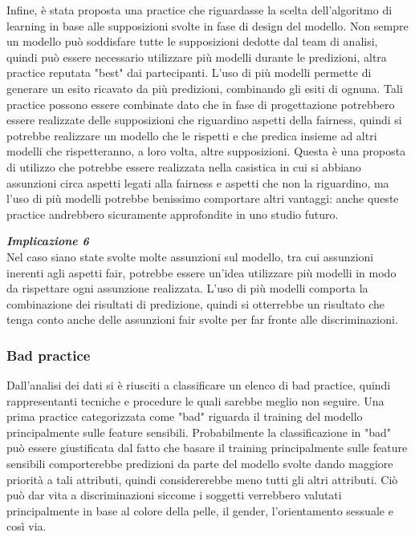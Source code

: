 Infine, è stata proposta una practice che riguardasse la scelta dell'algoritmo di learning in base alle supposizioni svolte in fase di design del modello. Non sempre un modello può soddisfare tutte le supposizioni dedotte dal team di analisi, quindi può essere necessario utilizzare più modelli durante le predizioni, altra practice reputata "best" dai partecipanti. L'uso di più modelli permette di generare un esito ricavato da più predizioni, combinando gli esiti di ognuna. Tali practice possono essere combinate dato che in fase di progettazione potrebbero essere realizzate delle supposizioni che riguardino aspetti della fairness, quindi si potrebbe realizzare un modello che le rispetti e che predica insieme ad altri modelli che rispetteranno, a loro volta, altre supposizioni. Questa è una proposta di utilizzo che potrebbe essere realizzata nella casistica in cui si abbiano assunzioni circa aspetti legati alla fairness e aspetti che non la riguardino, ma l'uso di più modelli potrebbe benissimo comportare altri vantaggi: anche queste practice andrebbero sicuramente approfondite in uno studio futuro.

\begin{center}
    \begin{tcolorbox}[width=400pt, colframe=black, colback=Gray!10]
			\begin{minipage}{\textwidth}
				\textit{\faCaretSquareORight  \textbf{ Implicazione 6}}\\
		     Nel caso siano state svolte molte assunzioni sul modello, tra cui assunzioni inerenti agli aspetti fair, potrebbe essere un'idea utilizzare più modelli in modo da rispettare ogni assunzione realizzata. L'uso di più modelli comporta la combinazione dei risultati di predizione, quindi si otterrebbe un risultato che tenga conto anche delle assunzioni fair svolte per far fronte alle discriminazioni.
			\end{minipage}
	\end{tcolorbox}
\end{center}

\subsubsection{Bad practice}
Dall'analisi dei dati si è riusciti a classificare un elenco di bad practice, quindi rappresentanti tecniche e procedure le quali sarebbe meglio non seguire. Una prima practice categorizzata come "bad" riguarda il training del modello principalmente sulle feature sensibili. Probabilmente la classificazione in "bad" può essere giustificata dal fatto che basare il training principalmente sulle feature sensibili comporterebbe predizioni da parte del modello svolte dando maggiore priorità a tali attributi, quindi considererebbe meno tutti gli altri attributi. Ciò può dar vita a discriminazioni siccome i soggetti verrebbero valutati principalmente in base al colore della pelle, il gender, l'orientamento sessuale e così via.

